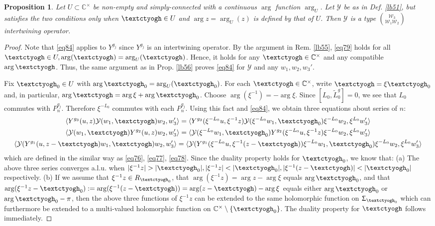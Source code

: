 \documentclass[11pt,b5paper,notitlepage]{article}
\theoremstyle{definition}
\theoremstyle{plain}
\newtheorem{pp}[df]{Proposition}
\newcommand{\mc}{\mathcal}
\newcommand{\wtd}{\widetilde}
\newcommand{\bk}[1]{\langle {#1}\rangle}
\newcommand{\Cbb}{\mathbb C}
\newcommand{\tipaz}{\text{\textctyogh}}
\numberwithin{equation}{subsection}
\begin{document}
\begin{pp}\label{lb57}
Let $U\subset\Cbb^\times$ be non-empty and simply-connected with a continuous $\arg$ function $\arg_U$. Let $\mc Y$ be as in Def. \ref{lb51}, but satisfies the two conditions only when $\tipaz\in U$ and $\arg z=\arg_U(z)$ is defined by that of $U$. Then $\mc Y$ is a type $\mc W_3\choose\mc W_1\mc W_2$ intertwining operator.
\end{pp}





\begin{proof}
Note that \eqref{eq84} applies to $Y^{g_j}$ since $Y^{g_j}$ is an intertwining operator. By the argument in Rem. \ref{lb55}, \eqref{eq79} holds  for all $\tipaz\in U,\arg(\tipaz)=\arg_U(\tipaz)$. Hence, it holds for any $\tipaz\in\Cbb^\times$ and any compatible $\arg\tipaz$. Thus, the same argument as in Prop. \ref{lb56} proves \eqref{eq84} for $\mc Y$ and any $w_1,w_2,w_3'$.

Fix $\tipaz_0\in U$ with $\arg\tipaz_0=\arg_U(\tipaz_0)$. For each $\tipaz\in\Cbb^\times$, write $\tipaz=\xi\tipaz_0$ and, in particular, $\arg\tipaz=\arg\xi+\arg\tipaz_0$. Choose $\arg(\xi^{-1})=-\arg\xi$. Since $[L_0,\wtd L_0^g]=0$, we see that $L_0$ commutes with $P_n^{g_j}$. Therefore $\xi^{-L_0}$ commutes with each $P_n^{g_j}$. Using this fact and \eqref{eq84}, we obtain three equations about series of $n$:
\begin{gather*}
\bk{Y^{g_3}(u,z)\mc Y(w_1,\tipaz)w_2,w_3'}=\bk{Y^{g_3}(\xi^{-L_0}u,\xi^{-1}z)\mc Y(\xi^{-L_0}w_1,\tipaz_0)\xi^{-L_0}w_2,\xi^{L_0}w_3'}\\
\bk{\mc Y(w_1,\tipaz)Y^{g_2}(u,z)w_2,w_3'}=\bk{\mc Y(\xi^{-L_0}w_1,\tipaz_0)Y^{g_2}(\xi^{-L_0}u,\xi^{-1}z)\xi^{-L_0}w_2,\xi^{L_0}w_3'}\\
\bk{\mc Y(Y^{g_1}(u,z-\tipaz)w_1,\tipaz)w_2,w'_3}=\bk{\mc Y(Y^{g_1}(\xi^{-L_0}u,\xi^{-1}(z-\tipaz))\xi^{-L_0}w_1,\tipaz_0)\xi^{-L_0}w_2,\xi^{L_0}w'_3}	
\end{gather*}
which are defined in the similar way as \eqref{eq76}, \eqref{eq77}, \eqref{eq78}. Since the duality property holds for $\tipaz_0$, we know that: (a) The above three series converges a.l.u. when $|\xi^{-1}z|>|\tipaz_0|,|\xi^{-1}z|<|\tipaz_0|,|\xi^{-1}(z-\tipaz)|<|\tipaz_0|$ respectively. (b) If we assume that $\xi^{-1}z\in R_{\tipaz_0}$, that $\arg(\xi^{-1}z)=\arg z-\arg\xi$ equals $\arg\tipaz_0$, and that $\arg(\xi^{-1}z-\tipaz_0):=\arg(\xi^{-1}(z-\tipaz))=\arg(z-\tipaz)-\arg\xi$ equals either $\arg \tipaz_0$ or $\arg\tipaz_0-\pi$, then the above three functions of $\xi^{-1}z$ can be extended to  the same holomorphic function on $\Upsigma_{\tipaz_0}$ which can furthermore be extended to a multi-valued holomorphic function on $\Cbb^\times\setminus\{\tipaz_0\}$. The duality property for $\tipaz$ follows immediately.
\end{proof}
\end{document}
